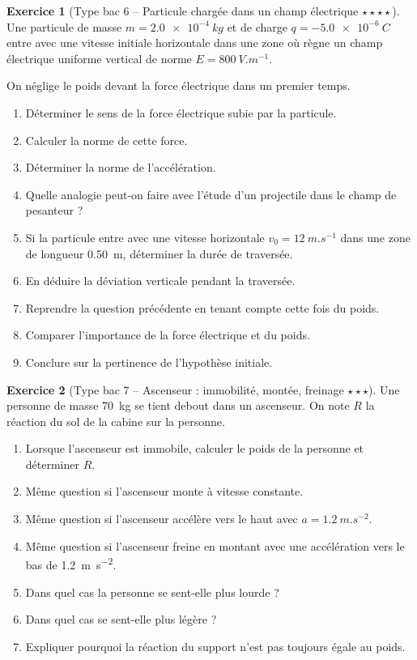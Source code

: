 \documentclass[11pt,a4paper]{article}
\theoremstyle{definition}
\newtheorem{exercice}{Exercice}[section]
\newcommand{\etoiles}[1]{\hfill{\small\textbf{#1}}}
\begin{document}
\begin{exercice}[Type bac 6 -- Particule chargée dans un champ électrique \etoiles{$\star\star\star\star$}]
Une particule de masse $m=\SI{2,0e-4}{kg}$ et de charge $q=-\SI{5,0e-6}{C}$
entre avec une vitesse initiale horizontale dans une zone où règne un champ électrique uniforme vertical
de norme $E=\SI{800}{V.m^{-1}}$.

On néglige le poids devant la force électrique dans un premier temps.

\begin{enumerate}[label=\arabic*.]
    \item Déterminer le sens de la force électrique subie par la particule.
    \item Calculer la norme de cette force.
    \item Déterminer la norme de l’accélération.
    \item Quelle analogie peut-on faire avec l’étude d’un projectile dans le champ de pesanteur ?
    \item Si la particule entre avec une vitesse horizontale $v_0=\SI{12}{m.s^{-1}}$ dans une zone de longueur
    \SI{0,50}{m}, déterminer la durée de traversée.
    \item En déduire la déviation verticale pendant la traversée.
    \item Reprendre la question précédente en tenant compte cette fois du poids.
    \item Comparer l’importance de la force électrique et du poids.
    \item Conclure sur la pertinence de l’hypothèse initiale.
\end{enumerate}
\end{exercice}

\begin{exercice}[Type bac 7 -- Ascenseur : immobilité, montée, freinage \etoiles{$\star\star\star$}]
Une personne de masse \SI{70}{kg} se tient debout dans un ascenseur.
On note $R$ la réaction du sol de la cabine sur la personne.

\begin{enumerate}[label=\arabic*.]
    \item Lorsque l’ascenseur est immobile, calculer le poids de la personne et déterminer $R$.
    \item Même question si l’ascenseur monte à vitesse constante.
    \item Même question si l’ascenseur accélère vers le haut avec $a=\SI{1,2}{m.s^{-2}}$.
    \item Même question si l’ascenseur freine en montant avec une accélération vers le bas de
    \SI{1,2}{m.s^{-2}}.
    \item Dans quel cas la personne se sent-elle plus lourde ?
    \item Dans quel cas se sent-elle plus légère ?
    \item Expliquer pourquoi la réaction du support n’est pas toujours égale au poids.
\end{enumerate}
\end{exercice}
\end{document}

